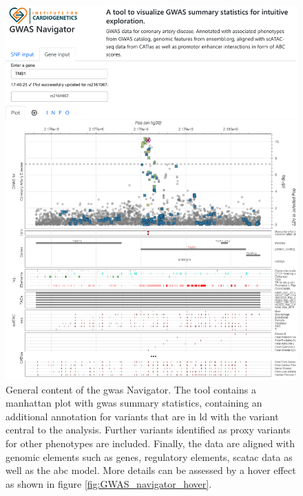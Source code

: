     \begin{figure}[H]
        \vspace*{-0.5cm}
        \capstart
        \centering
        \includegraphics{Abbildung/GWAS_navigator_screenshot.pdf}

        \begin{minipage}{\captionwidth}
            \caption[database]{\newline
            General content of the \ac{gwas} Navigator. The tool contains a manhattan plot with \ac{gwas} summary statistics, containing an additional annotation for variants that are in \ac{ld} with the variant central to the analysis. Further variants identified as proxy variants for other phenotypes are included. Finally, the data are aligned with genomic elements such as genes, regulatory elements, \ac{sc}\ac{atac} data as well as the \ac{abc} model. More details can be assessed by a hover effect as shown in figure \ref{fig:GWAS_navigator_hover}.}
            \label{fig:navigator}
        \end{minipage}
    \end{figure}

